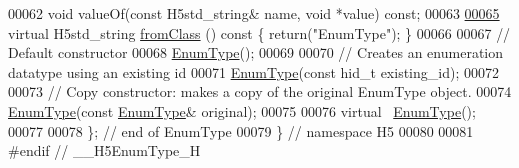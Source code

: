\begin{DoxyCode}
00062         \textcolor{keywordtype}{void} valueOf(\textcolor{keyword}{const} H5std\_string& name, \textcolor{keywordtype}{void} *value) \textcolor{keyword}{const};
00063 
\hyperlink{class_h5_1_1_enum_type_aeef68c3a71fb4d3516985007fb3410fd}{00065}         \textcolor{keyword}{virtual} H5std\_string \hyperlink{class_h5_1_1_enum_type_aeef68c3a71fb4d3516985007fb3410fd}{fromClass} ()\textcolor{keyword}{ const }\{ \textcolor{keywordflow}{return}(\textcolor{stringliteral}{"EnumType"}); \}
00066 
00067         \textcolor{comment}{// Default constructor}
00068         \hyperlink{class_h5_1_1_enum_type}{EnumType}();
00069 
00070         \textcolor{comment}{// Creates an enumeration datatype using an existing id}
00071         \hyperlink{class_h5_1_1_enum_type}{EnumType}(\textcolor{keyword}{const} hid\_t existing\_id);
00072 
00073         \textcolor{comment}{// Copy constructor: makes a copy of the original EnumType object.}
00074         \hyperlink{class_h5_1_1_enum_type}{EnumType}(\textcolor{keyword}{const} \hyperlink{class_h5_1_1_enum_type}{EnumType}& original);
00075 
00076         \textcolor{keyword}{virtual} ~\hyperlink{class_h5_1_1_enum_type}{EnumType}();
00077 
00078 \}; \textcolor{comment}{// end of EnumType}
00079 \} \textcolor{comment}{// namespace H5}
00080 
00081 \textcolor{preprocessor}{#endif // \_\_H5EnumType\_H}
\end{DoxyCode}
